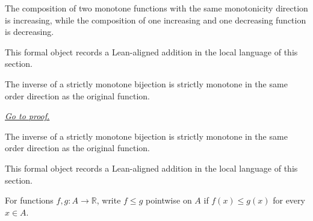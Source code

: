 \begin{remark*}
The composition of two monotone functions with the same monotonicity direction is increasing, while the composition of one increasing and one decreasing function is decreasing.
\end{remark*}

\begin{remark*}[Interpretation]
This formal object records a Lean-aligned addition in the local language of this section.
\end{remark*}

\begin{dependencies}
\NoLocalDependencies
\end{dependencies}
\begin{theorem}
\label{thm:inverse-of-strictly-monotone-bijection-is-strictly-monotone}
The inverse of a strictly monotone bijection is strictly monotone in the same order direction as the original function.

\smallskip
\noindent
\hyperref[prf:inverse-of-strictly-monotone-bijection-is-strictly-monotone]{\textit{Go to proof.}}
\end{theorem}

\begin{remark*}
The inverse of a strictly monotone bijection is strictly monotone in the same order direction as the original function.
\end{remark*}

\begin{remark*}[Interpretation]
This formal object records a Lean-aligned addition in the local language of this section.
\end{remark*}

\begin{dependencies}
\NoLocalDependencies
\end{dependencies}
\begin{definition}
\label{def:pointwise-le}
For functions $f,g:A\to\mathbb R$, write $f\le g$ pointwise on $A$ if $f(x)\le g(x)$ for every $x\in A$.
\end{definition}

